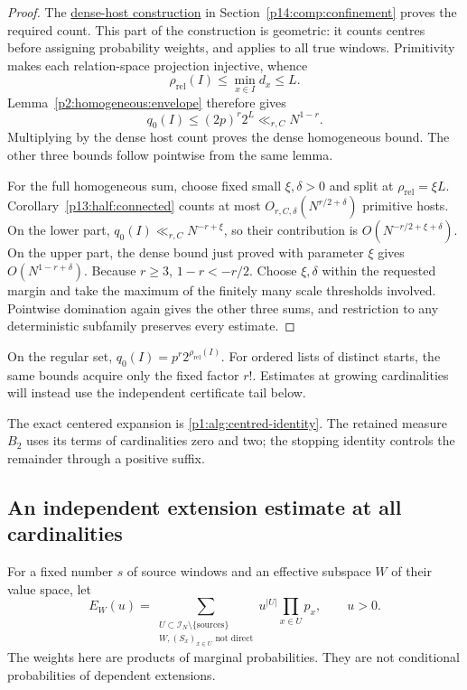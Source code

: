 \begin{proof}
The \hyperref[p18:conf:fixed-primitive]{dense-host construction}
in Section~\ref{p14:comp:confinement} proves the required count.
This part of the construction is geometric: it counts centres before
assigning probability weights, and applies to all true windows.
Primitivity makes each relation-space projection injective, whence
\[
 \rho_{\mathrm{rel}}(I)\le\min_{x\in I}d_x\le L.
\]
Lemma~\ref{p2:homogeneous:envelope} therefore gives
\[
 q_0(I)\le(2p)^r2^L\ll_{r,C}N^{1-r}.
\]
Multiplying by the dense host count proves the dense homogeneous bound.
The other three bounds follow pointwise from the same lemma.

For the full homogeneous sum, choose fixed small $\xi,\delta>0$ and
split at $\rho_{\mathrm{rel}}=\xi L$.
Corollary~\ref{p13:half:connected} counts at most
$O_{r,C,\delta}(N^{r/2+\delta})$ primitive hosts.
On the lower part,
$q_0(I)\ll_{r,C}N^{-r+\xi}$, so their contribution is
$O(N^{-r/2+\xi+\delta})$.
On the upper part, the dense bound just proved with parameter $\xi$
gives $O(N^{1-r+\delta})$.
Because $r\ge3$, $1-r<-r/2$.
Choose $\xi,\delta$ within the requested margin and take the maximum
of the finitely many scale thresholds involved. Pointwise domination
again gives the other three sums, and restriction to any deterministic
subfamily preserves every estimate.
\end{proof}

On the regular set, $q_0(I)=p^r2^{\rho_{\mathrm{rel}}(I)}$.
For ordered lists of distinct starts, the same bounds acquire only the
fixed factor $r!$. Estimates at growing cardinalities will instead use
the independent certificate tail below.


The exact centered expansion is
\eqref{p1:alg:centred-identity}. The retained measure $B_2$ uses its
terms of cardinalities zero and two; the stopping identity controls
the remainder through a positive suffix.

\subsection{An independent extension estimate at all cardinalities}

For a fixed number $s$ of source windows and an effective subspace $W$
of their value space, let
\[
 E_W(u)=\sum_{\substack{U\subset\mathcal I_N\setminus\{\text{sources}\}\\
                      W,(S_x)_{x\in U}\text{ not direct}}}
                 u^{|U|}\prod_{x\in U}p_x,
 \qquad u>0.
\]
The weights here are products of marginal probabilities. They are not
conditional probabilities of dependent extensions.

